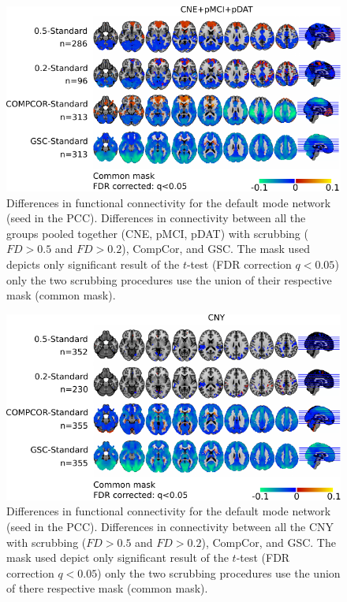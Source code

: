 \begin{figure}[H]
\begin{center}
\includegraphics[width=\linewidth]{../figures/figure_comp.pdf}
\end{center}
\caption[Impact of the preprocessing on the DMN (CNE,pMCI,pDAT)]{
Differences in functional connectivity for the default mode network (seed in the PCC). Differences in connectivity between all the groups pooled together (CNE, pMCI, pDAT) with scrubbing ($FD>0.5$ and $FD>0.2$), CompCor, and GSC. The mask used depicts only significant result of the $t$-test (FDR correction $q<0.05$) only the two scrubbing procedures use the union of their respective mask (common mask).
}
\label{fig_scrubbimpact}
\end{figure}

\begin{figure}[H]
\begin{center}
\includegraphics[width=\linewidth]{../figures/figure_comp_cny.pdf}
\end{center}
\caption[Impact of the preprocessing on the DMN (CNY)]{
{Differences in functional connectivity for the default mode network (seed in the PCC). Differences in connectivity between all the CNY with scrubbing ($FD>0.5$ and $FD>0.2$), CompCor, and GSC. The mask used depict only significant result of the $t$-test (FDR correction $q<0.05$) only the two scrubbing procedures use the union of there respective mask (common mask).}
}
\label{fig_sup_scrubbimpact_cny}
\end{figure}

